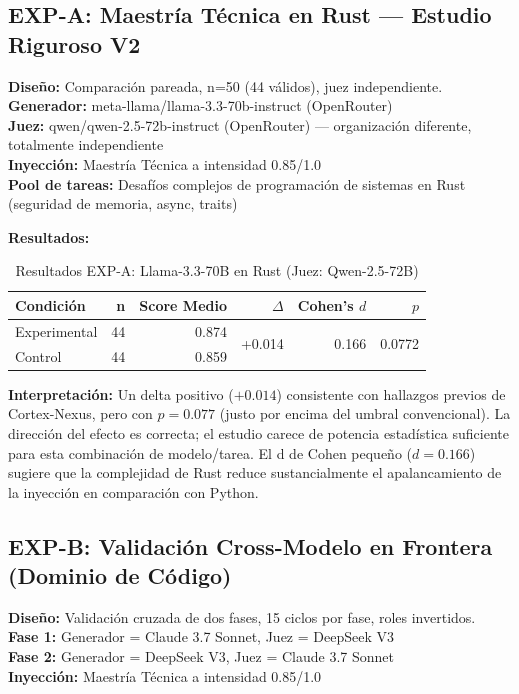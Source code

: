 \documentclass[12pt, a4paper]{article}
\begin{document}
\subsection{EXP-A: Maestría Técnica en Rust — Estudio Riguroso V2}
\textbf{Diseño:} Comparación pareada, n=50 (44 válidos), juez independiente.\\
\textbf{Generador:} meta-llama/llama-3.3-70b-instruct (OpenRouter)\\
\textbf{Juez:} qwen/qwen-2.5-72b-instruct (OpenRouter) — organización diferente, totalmente independiente\\
\textbf{Inyección:} Maestría Técnica a intensidad 0.85/1.0\\
\textbf{Pool de tareas:} Desafíos complejos de programación de sistemas en Rust (seguridad de memoria, async, traits)

\textbf{Resultados:}
\begin{table}[h]
\centering
\begin{tabular}{lrrrrr}
\toprule
Condición & n & Score Medio & $\Delta$ & Cohen's $d$ & $p$ \\
\midrule
Experimental & 44 & 0.874 & \multirow{2}{*}{+0.014} & \multirow{2}{*}{0.166} & \multirow{2}{*}{0.0772} \\
Control & 44 & 0.859 & & & \\
\bottomrule
\end{tabular}
\caption{Resultados EXP-A: Llama-3.3-70B en Rust (Juez: Qwen-2.5-72B)}
\end{table}

\textbf{Interpretación:} Un delta positivo ($+0.014$) consistente con hallazgos previos de Cortex-Nexus, pero con $p = 0.077$ (justo por encima del umbral convencional). La dirección del efecto es correcta; el estudio carece de potencia estadística suficiente para esta combinación de modelo/tarea. El d de Cohen pequeño ($d = 0.166$) sugiere que la complejidad de Rust reduce sustancialmente el apalancamiento de la inyección en comparación con Python.

\subsection{EXP-B: Validación Cross-Modelo en Frontera (Dominio de Código)}
\textbf{Diseño:} Validación cruzada de dos fases, 15 ciclos por fase, roles invertidos.\\
\textbf{Fase 1:} Generador = Claude 3.7 Sonnet, Juez = DeepSeek V3\\
\textbf{Fase 2:} Generador = DeepSeek V3, Juez = Claude 3.7 Sonnet\\
\textbf{Inyección:} Maestría Técnica a intensidad 0.85/1.0
\end{document}
